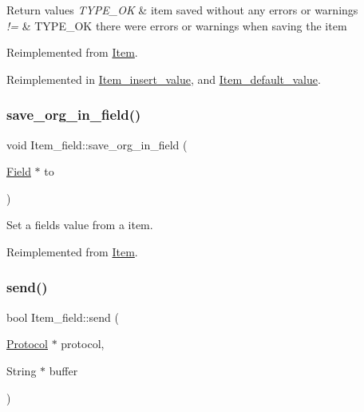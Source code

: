 \begin{DoxyRetVals}{Return values}
{\em T\+Y\+P\+E\+\_\+\+OK} & item saved without any errors or warnings \\
\hline
{\em !=} & T\+Y\+P\+E\+\_\+\+OK there were errors or warnings when saving the item \\
\hline
\end{DoxyRetVals}


Reimplemented from \mbox{\hyperlink{classItem_a463ded5f3c21ed2508dd8fddc6024722}{Item}}.



Reimplemented in \mbox{\hyperlink{classItem__insert__value_a66064a4540fb76d611f806c195c40886}{Item\+\_\+insert\+\_\+value}}, and \mbox{\hyperlink{classItem__default__value_addb79dad1639e8088ae278397d637fee}{Item\+\_\+default\+\_\+value}}.

\mbox{\label{classItem__field_a3d76ea6136e1f2437474a824d341cf0b}} 
\subsubsection{\texorpdfstring{save\+\_\+org\+\_\+in\+\_\+field()}{save\_org\_in\_field()}}
{\footnotesize\ttfamily void Item\+\_\+field\+::save\+\_\+org\+\_\+in\+\_\+field (\begin{DoxyParamCaption}\item[{\mbox{\hyperlink{classField}{Field}} $\ast$}]{to }\end{DoxyParamCaption})\hspace{0.3cm}{\ttfamily [virtual]}}

Set a field\textquotesingle{}s value from a item. 

Reimplemented from \mbox{\hyperlink{classItem}{Item}}.

\mbox{\label{classItem__field_aecd4c06e61ad49121f428f7156cd0dfb}} 
\subsubsection{\texorpdfstring{send()}{send()}}
{\footnotesize\ttfamily bool Item\+\_\+field\+::send (\begin{DoxyParamCaption}\item[{\mbox{\hyperlink{classProtocol}{Protocol}} $\ast$}]{protocol,  }\item[{String $\ast$}]{buffer }\end{DoxyParamCaption})\hspace{0.3cm}{\ttfamily [virtual]}}

